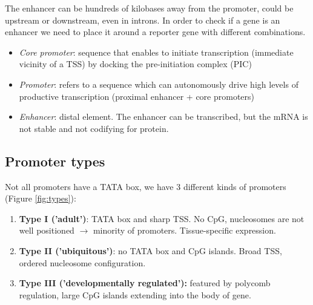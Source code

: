 The enhancer can be hundreds of kilobases away from the promoter, could be upstream or downstream, even in introns. In order to check if a gene is an enhancer we need to place it around a reporter gene with different combinations.

\begin{itemize}
\tightlist
\item
  \emph{Core promoter}: sequence that enables to initiate transcription (immediate vicinity of a TSS) by docking the pre-initiation complex (PIC)
\item
  \emph{Promoter}: refers to a sequence which can autonomously drive high levels of productive transcription (proximal enhancer + core promoters)
\item
  \emph{Enhancer}: distal element. The enhancer can be transcribed, but the mRNA is not stable and not codifying for protein.
\end{itemize}

\hypertarget{promoter-types}{%
\subsection{Promoter types}\label{promoter-types}}

Not all promoters have a TATA box, we have 3 different kinds of promoters (Figure  \ref{fig:types}):

\begin{enumerate}
\def\labelenumi{\arabic{enumi}.}
\tightlist
\item
  \textbf{Type I ('adult')}: TATA box and sharp TSS. No CpG, nucleosomes are not well positioned $\rightarrow$ minority of promoters. Tissue-specific expression.
\item
  \textbf{Type II ('ubiquitous')}: no TATA box and CpG islands. Broad TSS, ordered nucleosome configuration.
\item
  \textbf{Type III ('developmentally regulated'):} featured by polycomb regulation, large CpG islands extending into the body of gene.
\end{enumerate}

